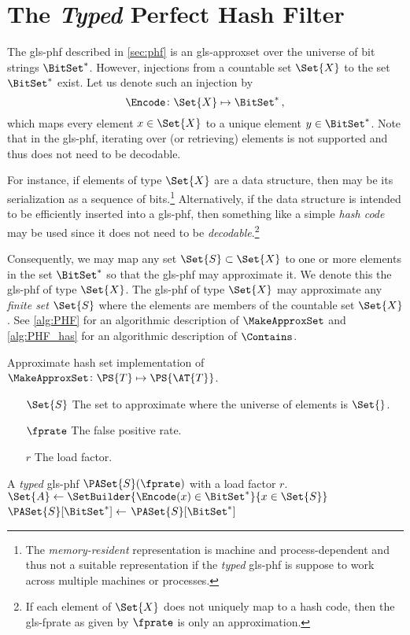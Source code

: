 \documentclass[ ../main.tex]{subfiles}
\begin{document}
\section{The \emph{Typed} Perfect Hash Filter}
The \gls{gls-phf} described in \cref{sec:phf} is an \gls{gls-approxset} over the universe of bit strings $\BitSet^*$. However, injections from a countable set $\Set{X}$ to the set $\BitSet^*$ exist. Let us denote such an injection by
\begin{equation}
    \Encode \colon \Set{X} \mapsto \BitSet^*\,,
\end{equation}
which maps every element $x \in \Set{X}$ to a unique element $y \in \BitSet^*$. Note that in the \gls{gls-phf}, iterating over (or retrieving) elements is not supported and thus \Encode does not need to be decodable.

For instance, if elements of type $\Set{X}$ are a data structure, then \Encode may be its serialization as a sequence of bits.\footnote{The \emph{memory-resident} representation is machine and process-dependent and thus not a suitable representation if the \emph{typed} \gls{gls-phf} is suppose to work across multiple machines or processes.} Alternatively, if the data structure is intended to be efficiently inserted into a \gls{gls-phf}, then something like a simple \emph{hash code} may be used since it does not need to be \emph{decodable}.\footnote{If each element of $\Set{X}$ does not uniquely map to a hash code, then the \gls{gls-fprate} as given by $\fprate$ is only an approximation.}

Consequently, we may map any set $\Set{S} \subset \Set{X}$ to one or more elements in the set $\BitSet^*$ so that the \gls{gls-phf} may approximate it. We denote this the \gls{gls-phf} of type $\Set{X}$. The \gls{gls-phf} of type $\Set{X}$ may approximate any \emph{finite set} $\Set{S}$ where the elements are members of the countable set $\Set{X}$. See \cref{alg:PHF} for an algorithmic description of $\MakeApproxSet$ and \cref{alg:PHF_has} for an algorithmic description of $\Contains$.
\begin{algorithm}[h]
    \caption[Approximate hash set data constructor]{Approximate hash set implementation of $\MakeApproxSet \colon \PS{T} \mapsto \PS{\AT{T}}$.}
    \label{alg:typedPHF}
    \KwIn
    {
        \begin{itemize}
            \item[$\Set{S}$] The set to approximate where the universe of elements is $\Set{}$.
            \item[$\fprate$] The false positive rate.
            \item[$r$] The load factor.
        \end{itemize}
    }
    \KwOut
    {
        A \emph{typed} \gls{gls-phf} $\PASet{S}(\fprate)$ with a load factor $r$.
    }
    {
        $\Set{A} \gets \SetBuilder{ \Encode(x) \in \BitSet^*}{ x \in \Set{S} }$\;
        $\PASet{S}[\BitSet^{*}] \gets$ \;
        \Return $\PASet{S}[\BitSet^{*}]$\;
    }
\end{algorithm}
\end{document}
